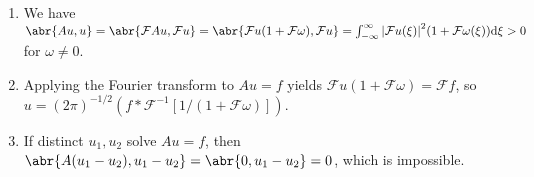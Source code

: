\documentclass[11pt,leqno]{article}
\theoremstyle{plain}
\theoremstyle{definition}
\numberwithin{equation}{section}
\numberwithin{lem}{section}
\begin{document}
\begin{enumerate}
\begin{enumerate}
      \item We have $\abr{Au,u} = \abr{\mathcal FAu,\mathcal Fu} = \abr{\mathcal Fu(1+\mathcal F\omega),\mathcal Fu} = \int_{-\infty}^\infty\abs{\mathcal Fu(\xi)}^2(1+\mathcal F\omega(\xi))\dd \xi>0$ for $\omega\neq 0$.
      \item Applying the Fourier transform to $Au = f$ yields $\mathcal Fu(1+\mathcal F\omega) = \mathcal Ff$, so $u = (2\pi)^{-1/2}(f\ast \mathcal F^{-1}[1/(1+\mathcal F\omega)])$.
      \item If distinct $u_1,u_2$ solve $Au = f$, then $\abr{A(u_1-u_2),u_1-u_2} = \abr{0,u_1-u_2} = 0$, which is impossible.
    \end{enumerate}
\end{enumerate}
\end{document}
